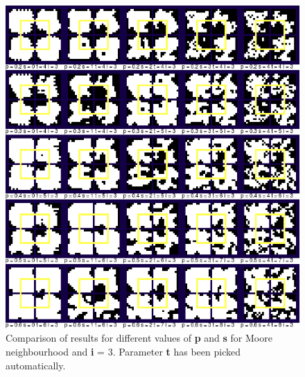 \documentclass[a4paper, 11pt]{article} %
\begin{document}
\begin{figure}[ht]
	\centering
	\includegraphics[width=1.\textwidth]{moore_sp}
	\caption{Comparison of results for different values of \textbf{p} and \textbf{s} for Moore neighbourhood and \textbf{i} = 3. Parameter \textbf{t} has been picked automatically.}
	\label{fig:results3}
\end{figure}
\end{document}
